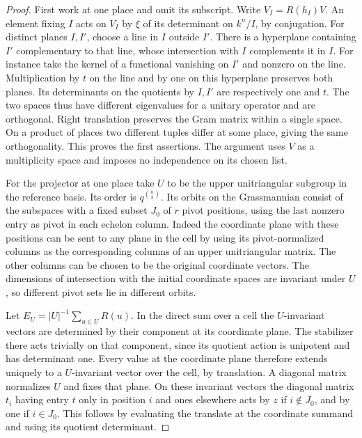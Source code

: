 \documentclass[a4paper,11pt]{article}
\theoremstyle{definition}
\theoremstyle{remark}
\numberwithin{equation}{section}
\begin{document}
\begin{proof}
First work at one place and omit its subscript. Write
\(V_I=R(h_I)V\). An element fixing \(I\) acts on \(V_I\)
by \(\xi\) of its determinant on \(k^n/I\), by conjugation.
For distinct planes \(I,I'\), choose a line in \(I\) outside
\(I'\). There is a hyperplane containing \(I'\) complementary
to that line, whose intersection with \(I\) complements it in
\(I\). For instance take the kernel of a functional vanishing
on \(I'\) and nonzero on the line. Multiplication by \(t\) on
the line and by one on this hyperplane preserves both planes.
Its determinants on the quotients by \(I,I'\) are respectively
one and \(t\). The two spaces thus have different eigenvalues
for a unitary operator and are orthogonal. Right translation
preserves the Gram matrix within a single space. On a product
of places two different tuples differ at some place, giving
the same orthogonality. This proves the first assertions.
The argument uses \(V\) as a multiplicity space and imposes
no independence on its chosen list.

For the projector at one place take \(U\) to be the upper
unitriangular subgroup in the reference basis. Its order is
\(q^{\binom n2}\). Its orbits on the Grassmannian consist of
the subspaces with a fixed subset \(J_0\) of \(r\) pivot positions,
using the last nonzero entry as pivot in each echelon column.
Indeed the coordinate plane with these positions can be sent
to any plane in the cell by using its pivot-normalized columns
as the corresponding columns of an upper unitriangular matrix.
The other columns can be chosen to be the original coordinate
vectors. The dimensions of intersection with the initial
coordinate spaces are invariant under \(U\), so different
pivot sets lie in different orbits.

Let \(E_U=|U|^{-1}\sum_{u\in U}R(u)\).
In the direct sum over a cell the \(U\)-invariant vectors are
determined by their component at its coordinate plane. The
stabilizer there acts trivially on that component, since its
quotient action is unipotent and has determinant one.
Every value at the coordinate plane therefore extends uniquely
to a \(U\)-invariant vector over the cell, by translation.
A diagonal matrix normalizes \(U\) and fixes that plane.
On these invariant vectors the diagonal matrix \(t_i\)
having entry \(t\) only in position \(i\) and ones elsewhere
acts by \(z\) if \(i\notin J_0\), and by one if \(i\in J_0\).
This follows by evaluating the translate at the coordinate
summand and using its quotient determinant.


\end{proof}
\end{document}
